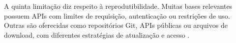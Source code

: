 A quinta limitação diz respeito à reprodutibilidade. Muitas bases relevantes possuem APIs com limites de requisição, autenticação ou restrições de uso. Outras são oferecidas como repositórios Git, APIs públicas ou arquivos de download, com diferentes estratégias de atualização e acesso \cite{nvd_vulnerability_apis,nvd_data_feeds,github_advisory_database_repo,osv_database,first_epss_data_stats,vulners_api_docs,virustotal_api_v3}.
